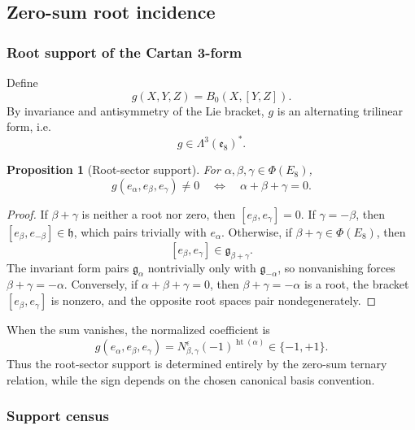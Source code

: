 \documentclass[11pt]{article}
\newtheorem{proposition}[theorem]{Proposition}
\theoremstyle{definition}
\theoremstyle{remark}
\newcommand{\e}{\mathfrak e}
\newcommand{\h}{\mathfrak h}
\newcommand{\PhiE}{\Phi(E_8)}
\begin{document}
\subsection{Zero-sum root incidence}\label{sec:incidence}

\subsubsection{Root support of the Cartan 3-form}

Define
\begin{equation}\label{eq:gdef}
g(X,Y,Z)=B_0(X,[Y,Z]).
\end{equation}
By invariance and antisymmetry of the Lie bracket, $g$ is an alternating trilinear form, i.e.
\[
g\in\Lambda^3(\e_8)^*.
\]

\begin{proposition}[Root-sector support]\label{prop:rootsupport}
For $\alpha,\beta,\gamma\in\PhiE$,
\[
g(e_\alpha,e_\beta,e_\gamma)\neq0
\quad\Longleftrightarrow\quad
\alpha+\beta+\gamma=0.
\]
\end{proposition}

\begin{proof}
If $\beta+\gamma$ is neither a root nor zero, then $[e_\beta,e_\gamma]=0$.  If $\gamma=-\beta$, then $[e_\beta,e_{-\beta}]\in\h$, which pairs trivially with $e_\alpha$.  Otherwise, if $\beta+\gamma\in\PhiE$, then
\[
[e_\beta,e_\gamma]\in\mathfrak g_{\beta+\gamma}.
\]
The invariant form pairs $\mathfrak g_\alpha$ nontrivially only with $\mathfrak g_{-\alpha}$, so nonvanishing forces $\beta+\gamma=-\alpha$.  Conversely, if $\alpha+\beta+\gamma=0$, then $\beta+\gamma=-\alpha$ is a root, the bracket $[e_\beta,e_\gamma]$ is nonzero, and the opposite root spaces pair nondegenerately.
\end{proof}

When the sum vanishes, the normalized coefficient is
\begin{equation}\label{eq:rrrcoeff}
g(e_\alpha,e_\beta,e_\gamma)
=N_{\beta,\gamma}^{\epsilon}(-1)^{\operatorname{ht}(\alpha)}\in\{-1,+1\}.
\end{equation}
Thus the root-sector support is determined entirely by the zero-sum ternary relation, while the sign depends on the chosen canonical basis convention.

\subsubsection{Support census}
\end{document}
